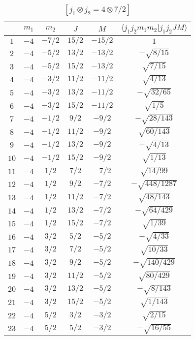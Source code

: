 \begin{table}
\tiny
\caption{$[j_1 \otimes j_2 = 4 \otimes 7/2]$}
\begin{center}
\begin{tabular}{|c|c|c|c|c|c|}
\hline 
   & $m_1$ & $m_2$ & $J$ & $M$ & $\langle j_1 j_2 m_1 m_2 | j_1 j_2 J M \rangle$ \\ 
\hline 
$1$ & $-4$ & $-7/2$ & $15/2$ & $-15/2$ & $1$ \\ 
$2$ & $-4$ & $-5/2$ & $13/2$ & $-13/2$ & $-\sqrt{8/15}$ \\ 
$3$ & $-4$ & $-5/2$ & $15/2$ & $-13/2$ & $\sqrt{7/15}$ \\ 
$4$ & $-4$ & $-3/2$ & $11/2$ & $-11/2$ & $\sqrt{4/13}$ \\ 
$5$ & $-4$ & $-3/2$ & $13/2$ & $-11/2$ & $-\sqrt{32/65}$ \\ 
$6$ & $-4$ & $-3/2$ & $15/2$ & $-11/2$ & $\sqrt{1/5}$ \\ 
$7$ & $-4$ & $-1/2$ & $9/2$ & $-9/2$ & $-\sqrt{28/143}$ \\ 
$8$ & $-4$ & $-1/2$ & $11/2$ & $-9/2$ & $\sqrt{60/143}$ \\ 
$9$ & $-4$ & $-1/2$ & $13/2$ & $-9/2$ & $-\sqrt{4/13}$ \\ 
$10$ & $-4$ & $-1/2$ & $15/2$ & $-9/2$ & $\sqrt{1/13}$ \\ 
$11$ & $-4$ & $1/2$ & $7/2$ & $-7/2$ & $\sqrt{14/99}$ \\ 
$12$ & $-4$ & $1/2$ & $9/2$ & $-7/2$ & $-\sqrt{448/1287}$ \\ 
$13$ & $-4$ & $1/2$ & $11/2$ & $-7/2$ & $\sqrt{48/143}$ \\ 
$14$ & $-4$ & $1/2$ & $13/2$ & $-7/2$ & $-\sqrt{64/429}$ \\ 
$15$ & $-4$ & $1/2$ & $15/2$ & $-7/2$ & $\sqrt{1/39}$ \\ 
$16$ & $-4$ & $3/2$ & $5/2$ & $-5/2$ & $-\sqrt{4/33}$ \\ 
$17$ & $-4$ & $3/2$ & $7/2$ & $-5/2$ & $\sqrt{10/33}$ \\ 
$18$ & $-4$ & $3/2$ & $9/2$ & $-5/2$ & $-\sqrt{140/429}$ \\ 
$19$ & $-4$ & $3/2$ & $11/2$ & $-5/2$ & $\sqrt{80/429}$ \\ 
$20$ & $-4$ & $3/2$ & $13/2$ & $-5/2$ & $-\sqrt{8/143}$ \\ 
$21$ & $-4$ & $3/2$ & $15/2$ & $-5/2$ & $\sqrt{1/143}$ \\ 
$22$ & $-4$ & $5/2$ & $3/2$ & $-3/2$ & $\sqrt{2/15}$ \\ 
$23$ & $-4$ & $5/2$ & $5/2$ & $-3/2$ & $-\sqrt{16/55}$ \\ 

\end{tabular}
\end{center}
\end{table}
